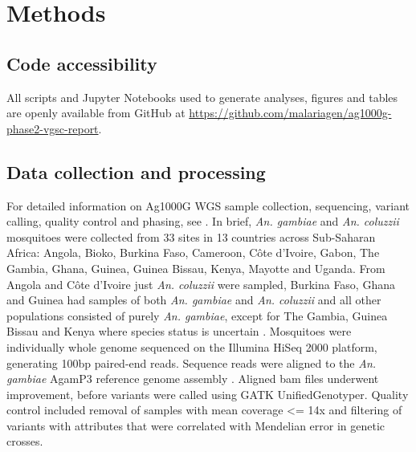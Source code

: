 \documentclass[a4paper,11pt,abstracton,hidelinks]{scrartcl}
\begin{document}
\section*{Methods}


\subsection*{Code accessibility}

%
All scripts and Jupyter Notebooks used to generate analyses, figures and tables are openly available from GitHub at \url{https://github.com/malariagen/ag1000g-phase2-vgsc-report}.


\subsection*{Data collection and processing}

%
For detailed information on Ag1000G WGS sample collection, sequencing, variant calling, quality control and phasing, see \cite{Ag1000gConsortium2017, clarkson2019genome}.
%
In brief, \emph{An. gambiae} and \emph{An. coluzzii} mosquitoes were collected from 33 sites in 13 countries across Sub-Saharan Africa: Angola, Bioko, Burkina Faso, Cameroon, C\^{o}te d'Ivoire, Gabon, The Gambia, Ghana, Guinea, Guinea Bissau, Kenya, Mayotte and Uganda.
%
From Angola and C\^{o}te d'Ivoire just \emph{An. coluzzii} were sampled, Burkina Faso, Ghana and Guinea had samples of both \emph{An. gambiae} and \emph{An. coluzzii} and all other populations consisted of purely \emph{An. gambiae}, except for The Gambia, Guinea Bissau and Kenya where species status is uncertain \cite{clarkson2019genome}.
%
Mosquitoes were individually whole genome sequenced on the Illumina HiSeq 2000 platform, generating 100bp paired-end reads.
%
Sequence reads were aligned to the \emph{An. gambiae} AgamP3 reference genome assembly \cite{Holt2002}.
%
Aligned bam files underwent improvement, before variants were called using GATK UnifiedGenotyper.
%
Quality control included removal of samples with mean coverage <= 14x and filtering of variants with attributes that were correlated with Mendelian error in genetic crosses.
\end{document}

